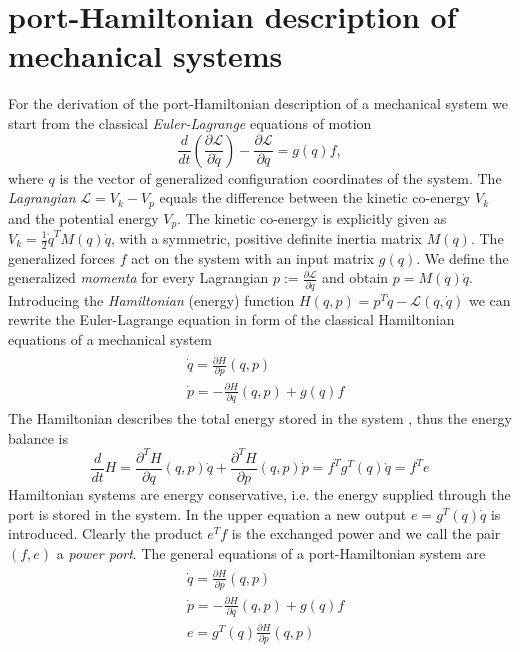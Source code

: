 \documentclass[a4paper,twoside, openright,12pt]{report}
\begin{document}
\section{port-Hamiltonian description of mechanical systems}\label{S:HSdescription}
For the derivation of the port-Hamiltonian description of a mechanical system we start from the classical \emph{Euler-Lagrange} equations of motion
\begin{equation}
\frac{d}{dt}\left(\frac{\partial \mathcal{L}}{\partial \dot{q}}\right) - \frac{\partial \mathcal{L}}{\partial q} = g(q)f,
\end{equation}
where $q$ is the vector of generalized configuration coordinates of the system. The \emph{Lagrangian} $\mathcal{L} = V_k - V_p$ equals the difference between the kinetic co-energy $V_k$ and the potential energy $V_p$. The kinetic co-energy is explicitly given as $V_k = \frac{1}{2} \dot{q}^T M(q) \dot{q}$, with a symmetric, positive definite inertia matrix $M(q)$. The generalized forces $f$ act on the system with an input matrix $g(q)$. We define the generalized \emph{momenta} for every Lagrangian $p := \frac{\partial \mathcal{L}}{\partial \dot{q}}$ and obtain $p = M(q)\dot{q}$.
Introducing the \emph{Hamiltonian} (energy) function $H(q,p) = p^T\dot{q} - \mathcal{L}(q,\dot{q})$ we can rewrite the Euler-Lagrange equation in form of the classical Hamiltonian equations of a mechanical system \begin{eqnarray}\label{EQ:mechanicalPHS}
	\begin{aligned}
	& \dot{q} = \frac{\partial H}{\partial p}(q,p)\\
	& \dot{p} = -\frac{\partial H}{\partial q}(q,p) + g(q)f
	\end{aligned}
\end{eqnarray}
The Hamiltonian describes the total energy stored in the system \cite{vanderSchaft_06}, thus the energy balance is
\begin{equation}
	\frac{d}{dt}H = \frac{\partial^T H}{\partial q}(q,p)\dot{q} + \frac{\partial^T H}{\partial p}(q,p)\dot{p} = f^Tg^T(q)\dot{q} = f^Te
\end{equation}
Hamiltonian systems are energy conservative, i.e. the energy supplied through the port is stored in the system. In the upper equation a new output $e=g^T(q)\dot{q}$ is introduced. Clearly the product $e^Tf$ is the exchanged power and we call the pair $(f,e)$ a \emph{power port}.
The general equations of a port-Hamiltonian system are
\begin{eqnarray}
\begin{aligned}
	& \dot{q} = \frac{\partial H}{\partial p}(q,p)\\
	& \dot{p} = -\frac{\partial H}{\partial q}(q,p)+g(q)f \\   &e = g^T(q)\frac{\partial H}{\partial p}(q,p)
\end{aligned}	
\end{eqnarray}
\end{document}
